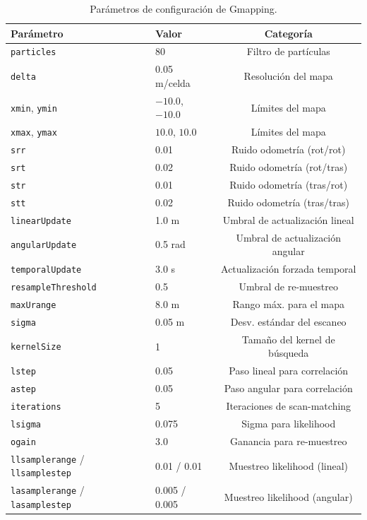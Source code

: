 \documentclass[12pt,letterpaper]{article}
\begin{document}
\begin{table}[H]
    \centering
    \caption{Parámetros de configuración de Gmapping.}
    \label{tab:gmapping_params}
    \small
    \begin{tabular}{llc}
        \hline
        \textbf{Parámetro} & \textbf{Valor} & \textbf{Categoría} \\
        \hline
        \texttt{particles} & 80 & Filtro de partículas \\
        \texttt{delta} & 0.05 m/celda & Resolución del mapa \\
        \texttt{xmin}, \texttt{ymin} & $-10.0$, $-10.0$ & Límites del mapa \\
        \texttt{xmax}, \texttt{ymax} & $10.0$, $10.0$ & Límites del mapa \\
        \texttt{srr} & 0.01 & Ruido odometría (rot/rot) \\
        \texttt{srt} & 0.02 & Ruido odometría (rot/tras) \\
        \texttt{str} & 0.01 & Ruido odometría (tras/rot) \\
        \texttt{stt} & 0.02 & Ruido odometría (tras/tras) \\
        \texttt{linearUpdate} & 1.0 m & Umbral de actualización lineal \\
        \texttt{angularUpdate} & 0.5 rad & Umbral de actualización angular \\
        \texttt{temporalUpdate} & 3.0 s & Actualización forzada temporal \\
        \texttt{resampleThreshold} & 0.5 & Umbral de re-muestreo \\
        \texttt{maxUrange} & 8.0 m & Rango máx. para el mapa \\
        \texttt{sigma} & 0.05 m & Desv. estándar del escaneo \\
        \texttt{kernelSize} & 1 & Tamaño del kernel de búsqueda \\
        \texttt{lstep} & 0.05 & Paso lineal para correlación \\
        \texttt{astep} & 0.05 & Paso angular para correlación \\
        \texttt{iterations} & 5 & Iteraciones de scan-matching \\
        \texttt{lsigma} & 0.075 & Sigma para likelihood \\
        \texttt{ogain} & 3.0 & Ganancia para re-muestreo \\
        \texttt{llsamplerange} / \texttt{llsamplestep} & 0.01 / 0.01 & Muestreo likelihood (lineal) \\
        \texttt{lasamplerange} / \texttt{lasamplestep} & 0.005 / 0.005 & Muestreo likelihood (angular) \\
        \hline
    \end{tabular}
\end{table}
\end{document}
